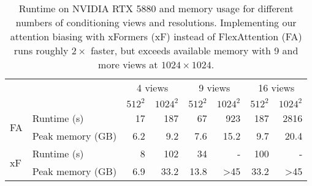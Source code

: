 \begin{table}[t]
    \centering
    \small
    \caption{Runtime on NVIDIA RTX 5880 and memory usage for different numbers of conditioning views and resolutions.
    Implementing our attention biasing with xFormers (xF) instead of FlexAttention (FA) runs roughly $2\times$ faster, but exceeds available memory with 9 and more views at $1024 \times 1024$.
    }
    \label{tab:runtime}
    \setlength{\tabcolsep}{0.009\textwidth}%
    \begin{tabular}{llrrrrrr}
        \toprule
        && \multicolumn{2}{c}{4 views} & \multicolumn{2}{c}{9 views} & \multicolumn{2}{c}{16 views} \\
        \cmidrule(lr){3-4}
        \cmidrule(lr){5-6}
        \cmidrule(lr){7-8}
        && $512^2$ & $1024^2$ & $512^2$ & $1024^2$ & $512^2$ & $1024^2$ \\
        \midrule
        \multirow{2}{*}{FA} & Runtime (s) & 17 & 187 & 67 & 923 & 187 & 2816 \\
        & Peak memory (GB) & 6.2 & 9.2 & 7.6 & 15.2 & 9.7 & 20.4 \\
        \midrule
        \multirow{2}{*}{xF} & Runtime (s) & 8 & 102 & 34 & - & 100 & - \\
        & Peak memory (GB) & 6.9 & 33.2 & 13.8 & >45 & 33.2 & >45 \\
        \bottomrule
    \end{tabular}
\end{table}




